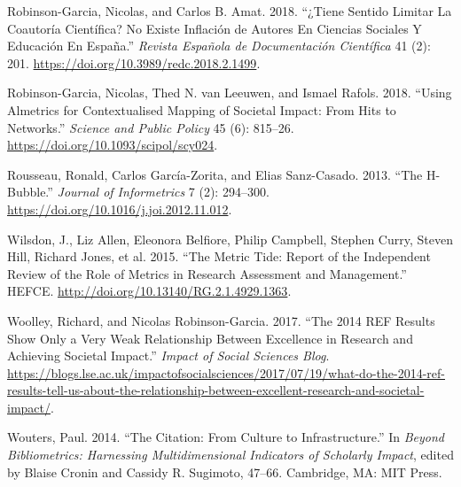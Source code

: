 \documentclass[]{elsarticle} %
\begin{document}
\leavevmode\hypertarget{ref-robinson-garciaTieneSentidoLimitar2018}{}%
Robinson-Garcia, Nicolas, and Carlos B. Amat. 2018. ``¿Tiene Sentido
Limitar La Coautoría Científica? No Existe Inflación de Autores En
Ciencias Sociales Y Educación En España.'' \emph{Revista Española de
Documentación Científica} 41 (2): 201.
\url{https://doi.org/10.3989/redc.2018.2.1499}.

\leavevmode\hypertarget{ref-robinson-garciaUsingAlmetricsContextualised2018}{}%
Robinson-Garcia, Nicolas, Thed N. van Leeuwen, and Ismael Rafols. 2018.
``Using Almetrics for Contextualised Mapping of Societal Impact: From
Hits to Networks.'' \emph{Science and Public Policy} 45 (6): 815--26.
\url{https://doi.org/10.1093/scipol/scy024}.

\leavevmode\hypertarget{ref-rousseauHbubble2013}{}%
Rousseau, Ronald, Carlos García-Zorita, and Elias Sanz-Casado. 2013.
``The H-Bubble.'' \emph{Journal of Informetrics} 7 (2): 294--300.
\url{https://doi.org/10.1016/j.joi.2012.11.012}.

\leavevmode\hypertarget{ref-wilsdonMetricTideReport2015}{}%
Wilsdon, J., Liz Allen, Eleonora Belfiore, Philip Campbell, Stephen
Curry, Steven Hill, Richard Jones, et al. 2015. ``The Metric Tide:
Report of the Independent Review of the Role of Metrics in Research
Assessment and Management.'' HEFCE.
\url{http://doi.org/10.13140/RG.2.1.4929.1363}.

\leavevmode\hypertarget{ref-woolley2014REFResults2017}{}%
Woolley, Richard, and Nicolas Robinson-Garcia. 2017. ``The 2014 REF
Results Show Only a Very Weak Relationship Between Excellence in
Research and Achieving Societal Impact.'' \emph{Impact of Social
Sciences Blog}.
\url{https://blogs.lse.ac.uk/impactofsocialsciences/2017/07/19/what-do-the-2014-ref-results-tell-us-about-the-relationship-between-excellent-research-and-societal-impact/}.

\leavevmode\hypertarget{ref-woutersCitationCultureInfrastructure2014}{}%
Wouters, Paul. 2014. ``The Citation: From Culture to Infrastructure.''
In \emph{Beyond Bibliometrics: Harnessing Multidimensional Indicators of
Scholarly Impact}, edited by Blaise Cronin and Cassidy R. Sugimoto,
47--66. Cambridge, MA: MIT Press.
\end{document}
